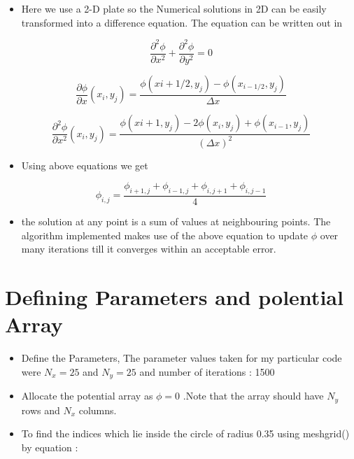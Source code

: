 \documentclass[11pt, a4paper]{article}
\begin{document}
    
    \begin{itemize}
    \item
      Here we use a 2-D plate so the Numerical solutions in 2D can be easily
      transformed into a difference equation. The equation can be written
      out in
    \end{itemize}
    
    \begin{equation}
    \frac{\partial^{2} \phi}{\partial x^{2}}+ \frac{\partial^{2} \phi}{\partial y^{2}} = 0
     \end{equation}
    
    \begin{equation}
    \frac{\partial \phi}{\partial x}{(x_i,y_j)} = \frac{\phi(x{i+1/2},y_j) - \phi(x_{i-1/2},y_j)}{\Delta x}
     \end{equation}
    
    \begin{equation}
    \frac{\partial^{2} \phi}{\partial x^{2}}{(x_i,y_j)} = \frac{\phi(x{i+1},y_j) -2\phi(x_i,y_j)+ \phi(x_{i-1},y_j)}{(\Delta x)^{2}}
     \end{equation}
    
    \begin{itemize}
    \item
      Using above equations we get
    \end{itemize}
    
    \begin{equation}
            \phi_{i,j} = \frac{\phi_{i+1,j} + \phi_{i-1,j} + \phi_{i,j+1} + \phi_{i,j-1}}{4} 
    \end{equation}
    
    \begin{itemize}
    \item
     the solution at any point is a sum of values at neighbouring points.  The algorithm implemented makes use of the above equation to update $\phi$ over many iterations till it converges within an acceptable error.
  \end{itemize}

  \section{Defining Parameters and polential Array}
  

\begin{itemize}
\item
  Define the Parameters, The parameter values taken for my particular code were \(N_x = 25\) and \(N_y = 25\) and number of iterations : 1500
\item
  Allocate the potential array as \(\phi = 0\) .Note that the array
  should have \(N_y\) rows and \(N_x\) columns.
\item
  To find the indices which lie inside the circle of radius 0.35 using
  meshgrid() by equation :
\end{itemize}
\end{document}
